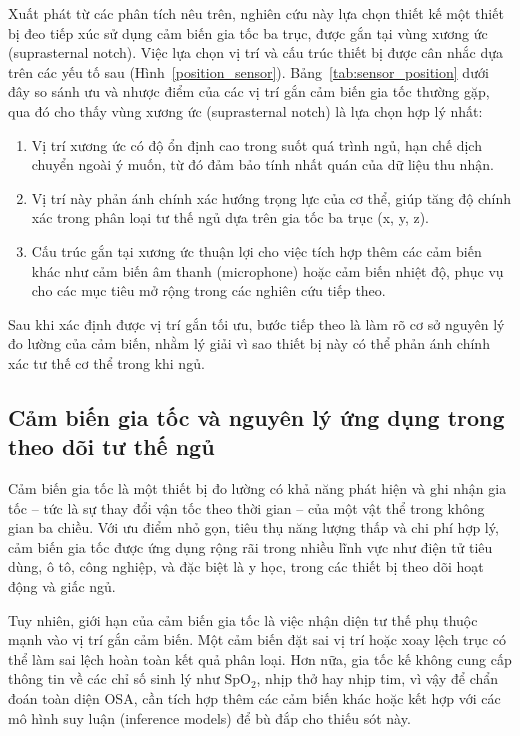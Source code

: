 Xuất phát từ các phân tích nêu trên, nghiên cứu này lựa chọn thiết kế một thiết
bị đeo tiếp xúc sử dụng cảm biến gia tốc ba trục, được gắn tại vùng xương ức
(suprasternal notch). Việc lựa chọn vị trí và cấu trúc thiết bị được cân nhắc
dựa trên các yếu tố sau (Hình~\ref{position_sensor}).
Bảng~\ref{tab:sensor_position} dưới đây so sánh ưu và nhược điểm của các vị trí
gắn cảm biến gia tốc thường gặp, qua đó cho thấy vùng xương ức (suprasternal
notch) là lựa chọn hợp lý nhất:

\begin{enumerate}
  \item Vị trí xương ức có độ ổn định cao trong suốt quá trình ngủ, hạn chế dịch chuyển
        ngoài ý muốn, từ đó đảm bảo tính nhất quán của dữ liệu thu nhận.
  \item Vị trí này phản ánh chính xác hướng trọng lực của cơ thể, giúp tăng độ chính
        xác trong phân loại tư thế ngủ dựa trên gia tốc ba trục (x, y, z).
  \item Cấu trúc gắn tại xương ức thuận lợi cho việc tích hợp thêm các cảm biến khác
        như cảm biến âm thanh (microphone) hoặc cảm biến nhiệt độ, phục vụ cho các mục
        tiêu mở rộng trong các nghiên cứu tiếp theo.
\end{enumerate}

Sau khi xác định được vị trí gắn tối ưu, bước tiếp theo là làm rõ cơ sở nguyên
lý đo lường của cảm biến, nhằm lý giải vì sao thiết bị này có thể phản ánh
chính xác tư thế cơ thể trong khi ngủ.

\subsection*{Cảm biến gia tốc và nguyên lý ứng dụng trong theo dõi tư thế ngủ}

Cảm biến gia tốc là một thiết bị đo lường có khả năng phát hiện và ghi nhận gia
tốc – tức là sự thay đổi vận tốc theo thời gian – của một vật thể trong không
gian ba chiều. Với ưu điểm nhỏ gọn, tiêu thụ năng lượng thấp và chi phí hợp lý,
cảm biến gia tốc được ứng dụng rộng rãi trong nhiều lĩnh vực như điện tử tiêu
dùng, ô tô, công nghiệp, và đặc biệt là y học, trong các thiết bị theo dõi hoạt
động và giấc ngủ.

Tuy nhiên, giới hạn của cảm biến gia tốc là việc nhận diện tư thế phụ thuộc
mạnh vào vị trí gắn cảm biến. Một cảm biến đặt sai vị trí hoặc xoay lệch trục
có thể làm sai lệch hoàn toàn kết quả phân loại. Hơn nữa, gia tốc kế không cung
cấp thông tin về các chỉ số sinh lý như $\mathrm{SpO_2}$, nhịp thở hay nhịp
tim, vì vậy để chẩn đoán toàn diện OSA, cần tích hợp thêm các cảm biến khác
hoặc kết hợp với các mô hình suy luận (inference models) để bù đắp cho thiếu
sót này.

